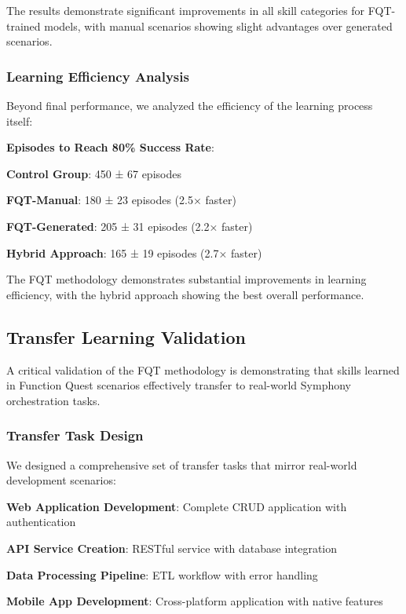 The results demonstrate significant improvements in all skill categories for FQT-trained models, with manual scenarios showing slight advantages over generated scenarios.

\subsubsection*{Learning Efficiency Analysis}

Beyond final performance, we analyzed the efficiency of the learning process itself:

\begin{infobox}[title=Learning Efficiency Comparison]
\textbf{Episodes to Reach 80\% Success Rate}:
\begin{compactlist}
    \item \textbf{Control Group}: 450 ± 67 episodes
    \item \textbf{FQT-Manual}: 180 ± 23 episodes (2.5× faster)
    \item \textbf{FQT-Generated}: 205 ± 31 episodes (2.2× faster)
    \item \textbf{Hybrid Approach}: 165 ± 19 episodes (2.7× faster)
\end{compactlist}
\end{infobox}

The FQT methodology demonstrates substantial improvements in learning efficiency, with the hybrid approach showing the best overall performance.

\subsection*{Transfer Learning Validation}

A critical validation of the FQT methodology is demonstrating that skills learned in Function Quest scenarios effectively transfer to real-world Symphony orchestration tasks.

\subsubsection*{Transfer Task Design}

We designed a comprehensive set of transfer tasks that mirror real-world development scenarios:

\begin{expandedlist}
    \item \textbf{Web Application Development}: Complete CRUD application with authentication
    \item \textbf{API Service Creation}: RESTful service with database integration
    \item \textbf{Data Processing Pipeline}: ETL workflow with error handling
    \item \textbf{Mobile App Development}: Cross-platform application with native features
\end{expandedlist}


